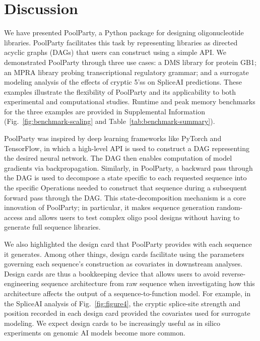 \documentclass[pdflatex,sn-vancouver-num,referee,oneside]{sn-jnl}
\newif\ifshowquoted
\newcommand{\quoted}[1]{\ifshowquoted\textcolor{quotedtext}{#1}\else#1\fi}
\begin{document}
\section*{Discussion}\label{sec:discussion}

\quoted{We have presented PoolParty, a Python package for designing oligonucleotide libraries. PoolParty facilitates this task by representing libraries as directed acyclic graphs (DAGs) that users can construct using a simple API.} We demonstrated PoolParty through three use cases: a DMS library for protein GB1; an MPRA library probing transcriptional regulatory grammar; and a surrogate modeling analysis of the effects of cryptic 5'ss on SpliceAI predictions. These examples illustrate the flexibility of PoolParty and its applicability to both experimental and computational studies. Runtime and peak memory benchmarks for the three examples are provided in Supplemental Information (Fig.~\ref{fig:benchmark-scaling} and Table~\ref{tab:benchmark-summary}).

PoolParty was inspired by deep learning frameworks like PyTorch and TensorFlow, in which a high-level API is used to construct a DAG representing the desired neural network. The DAG then enables computation of model gradients via backpropagation. Similarly, in PoolParty, a backward pass through the DAG is used to decompose a state specific to each requested sequence into the specific Operations needed to construct that sequence during a subsequent forward pass through the DAG. This state-decomposition mechanism is a core innovation of PoolParty; in particular, it makes sequence generation random-access and allows users to test complex oligo pool designs without having to generate full sequence libraries.

We also highlighted the design card that PoolParty provides with each sequence it generates. Among other things, design cards facilitate using the parameters governing each sequence's construction as covariates in downstream analyses. \quoted{Design cards are thus a bookkeeping device that allows users to avoid reverse-engineering sequence architecture from raw sequence when investigating how this architecture affects the output of a sequence-to-function model.} \quoted{For example, in the SpliceAI analysis of Fig.~\ref{fig:figure4}, the cryptic splice-site strength and position recorded in each design card provided the covariates used for surrogate modeling.} We expect design cards to be increasingly useful as in silico experiments on genomic AI models become more common.
\end{document}
